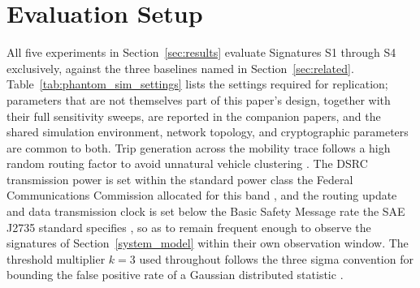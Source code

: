 \documentclass[final,5p,twocolumn]{elsarticle}
\theoremstyle{remark}
\theoremstyle{plain}
\begin{document}
\section{Evaluation Setup}
\label{sec:evaluation_setup}

All five experiments in Section~\ref{sec:results} evaluate Signatures S1
through S4 exclusively, against the three baselines named in
Section~\ref{sec:related}. Table~\ref{tab:phantom_sim_settings} lists the
settings required for replication; parameters that are not themselves part
of this paper's design, together with their full sensitivity sweeps, are
reported in the companion papers, and the shared simulation environment,
network topology, and cryptographic parameters are common to both. Trip
generation across the mobility trace follows a high random routing factor
to avoid unnatural vehicle clustering \cite{sumo_randomtrips}. The DSRC
transmission power is set within the standard power class the Federal
Communications Commission allocated for this band
\cite{FCC03-324}, and the routing update and data transmission clock is
set below the Basic Safety Message rate the SAE J2735 standard specifies
\cite{sae_j2735}, so as to remain frequent enough to observe the
signatures of Section~\ref{system_model} within their own observation
window. The threshold multiplier $k{=}3$ used throughout follows the
three sigma convention for bounding the false positive rate of a
Gaussian distributed statistic \cite{pukelsheim1994three}.
\end{document}
